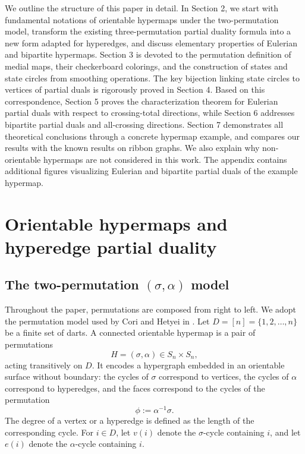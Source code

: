 \documentclass{article}
\begin{document}
We outline the structure of this paper in detail. In Section 2, we start with fundamental notations of orientable hypermaps under the two-permutation model, transform the existing three-permutation partial duality formula into a new form adapted for hyperedges, and discuss elementary properties of Eulerian and bipartite hypermaps. Section 3 is devoted to the permutation definition of medial maps, their checkerboard colorings, and the construction of states and state circles from smoothing operations. The key bijection linking state circles to vertices of partial duals is rigorously proved in Section 4. Based on this correspondence, Section 5 proves the characterization theorem for Eulerian partial duals with respect to crossing-total directions, while Section 6 addresses bipartite partial duals and all-crossing directions. Section 7 demonstrates all theoretical conclusions through a concrete hypermap example, and compares our results with the known results on ribbon graphs. We also explain why non-orientable hypermaps are not considered in this work. The appendix contains additional figures visualizing Eulerian and bipartite partial duals of the example hypermap.


\section{Orientable hypermaps and hyperedge partial duality}

\subsection{The two-permutation \texorpdfstring{$(\sigma,\alpha)$}{(sigma, alpha)} model}

Throughout the paper, permutations are composed from right to left. We adopt the permutation model used by Cori and Hetyei in \cite[\S 1.1]{CoriHetyei2025}. Let $D=[n]=\{1,2,\dots,n\}$ be a finite set of darts. A connected orientable hypermap is a pair of permutations
\[
H=(\sigma,\alpha)\in S_n\times S_n,
\]
acting transitively on $D$. It encodes a hypergraph embedded in an orientable surface without boundary: the cycles of $\sigma$ correspond to vertices, the cycles of $\alpha$ correspond to hyperedges, and the faces correspond to the cycles of the permutation
\[
\phi:=\alpha^{-1}\sigma.
\]
The degree of a vertex or a hyperedge is defined as the length of the corresponding cycle. For $i\in D$, let $v(i)$ denote the $\sigma$-cycle containing $i$, and let $e(i)$ denote the $\alpha$-cycle containing $i$.
\end{document}
